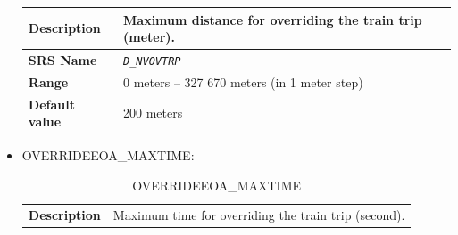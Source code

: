 \begin{itemize}
\begin{longtable}{|l|l|}
					\begin{minipage}[t]{0.22\linewidth} \textbf{Description}	\end{minipage}
				&	\begin{minipage}[t]{0.78\linewidth} Maximum distance for overriding the train trip (meter). \end{minipage} \\

				\hline

					\begin{minipage}[t]{0.22\linewidth} \textbf{SRS Name}	\end{minipage}
				&	\begin{minipage}[t]{0.78\linewidth} \emph{\texttt{D\_NVOVTRP}} \end{minipage} \\

				\hline

					\begin{minipage}[t]{0.22\linewidth} \textbf{Range}	\end{minipage}
				&	\begin{minipage}[t]{0.78\linewidth} 0 meters – 327 670 meters (in 1 meter step) \end{minipage} \\

				\hline

					\begin{minipage}[t]{0.22\linewidth} \textbf{Default value}	\end{minipage}
				&	\begin{minipage}[t]{0.78\linewidth} 200 meters \end{minipage} \\

				\hline

			\end{longtable}


		\item OVERRIDEEOA\_MAXTIME:

			\begin{longtable}{|l|l|}
				\caption{OVERRIDEEOA\_MAXTIME}\\
				\hline

					\begin{minipage}[t]{0.22\linewidth} \textbf{Description}	\end{minipage}
				&	\begin{minipage}[t]{0.78\linewidth} Maximum time for overriding the train trip (second). \end{minipage} \\


\end{longtable}
\end{itemize}
